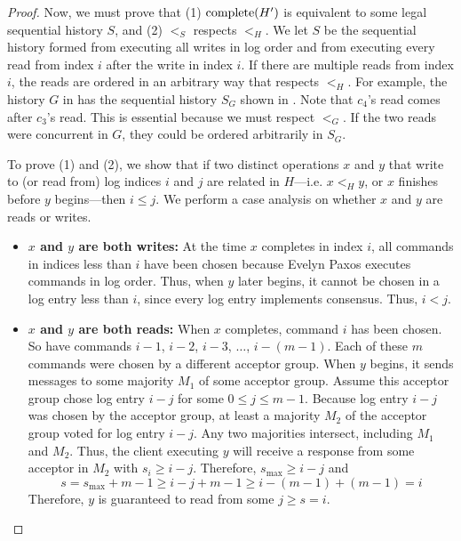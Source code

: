 \begin{proof}
  Now, we must prove that (1) $\text{complete}(H')$ is equivalent to some legal
  sequential history $S$, and (2) $<_S$ respects $<_H$. We let $S$ be the
  sequential history formed from executing all writes in log order and from
  executing every read from index $i$ after the write in index $i$.
  If there are multiple reads from index $i$, the reads are ordered in an
  arbitrary way that respects $<_H$. For example, the history $G$ in
   has the sequential history $S_G$ shown in
  . Note that $c_4$'s read comes after $c_3$'s read. This is
  essential because we must respect $<_G$. If the two reads were concurrent in
  $G$, they could be ordered arbitrarily in $S_G$.

  {}

  To prove (1) and (2), we show that if two distinct operations $x$ and $y$
  that write to (or read from) log indices $i$ and $j$ are related in
  $H$---i.e. $x <_H y$, or $x$ finishes before $y$ begins---then $i \leq j$. We
  perform a case analysis on whether $x$ and $y$ are reads or writes.

  \begin{itemize}
    \item \textbf{$x$ and $y$ are both writes:}
      At the time $x$ completes in index $i$, all commands in indices less than
      $i$ have been chosen because Evelyn Paxos executes commands in log order.
      Thus, when $y$ later begins, it cannot be chosen in a log entry less than
      $i$, since every log entry implements consensus. Thus, $i < j$.

    \item \textbf{$x$ and $y$ are both reads:}
      When $x$ completes, command $i$ has been chosen. So have commands $i-1$,
      $i-2$, $i-3$, $\ldots$, $i-(m-1)$. Each of these $m$ commands were chosen
      by a different acceptor group.
      When $y$ begins, it sends  messages to some majority
      $M_1$ of some acceptor group. Assume this acceptor group chose log entry
      $i - j$ for some $0 \leq j \leq m-1$.  Because log entry $i-j$ was chosen
      by the acceptor group, at least a majority $M_2$ of the acceptor group
      voted for log entry $i-j$.  Any two majorities intersect, including $M_1$
      and $M_2$.  Thus, the client executing $y$ will receive a
       response from some acceptor in $M_2$ with $s_i \geq
      i-j$. Therefore, $s_\text{max} \geq i - j$ and
      \[
        s = s_\text{max} + m - 1
          \geq i - j + m - 1
          \geq i - (m-1) + (m - 1)
          = i
      \]
      Therefore, $y$ is guaranteed to read from some $j \geq s = i$.


\end{itemize}
\end{proof}
